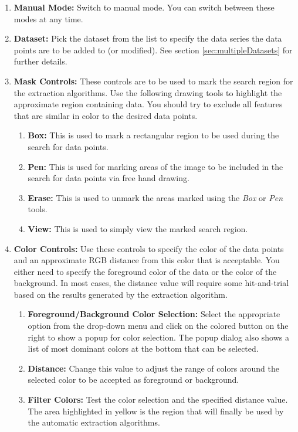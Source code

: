 \documentclass[letterpaper, 11pt]{article}
\begin{document}
\begin{enumerate}
\item{{\bf Manual Mode: }Switch to manual mode. You can switch between these modes at any time.}
\item{{\bf Dataset: }Pick the dataset from the list to specify the data series the data points are to be added to (or modified). See section \ref{sec:multipleDatasets} for further details.}
\item{{\bf Mask Controls:} These controls are to be used to mark the search region for the extraction algorithms. Use the following drawing tools to highlight the approximate region containing data. You should try to exclude all features that are similar in color to the desired data points.}
\begin{enumerate}
    \item{{\bf Box: }This is used to mark a rectangular region to be used during the search for data points.}
    \item{{\bf Pen: }This is used for marking areas of the image to be included in the search for data points via free hand drawing.}
    \item{{\bf Erase: }This is used to unmark the areas marked using the \emph{Box} or \emph{Pen} tools.}
    \item{{\bf View: }This is used to simply view the marked search region.}
\end{enumerate}
\item{{\bf Color Controls: } Use these controls to specify the color of the data points and an approximate RGB distance from this color that is acceptable. You either need to specify the foreground color of the data or the color of the background. In most cases, the distance value will require some hit-and-trial based on the results generated by the extraction algorithm.}
\begin{enumerate}
    \item{{\bf Foreground/Background Color Selection: }Select the appropriate option from the drop-down menu and click on the colored button on the right to show a popup for color selection. The popup dialog also shows a list of most dominant colors at the bottom that can be selected.}
    \item{{\bf Distance: }Change this value to adjust the range of colors around the selected color to be accepted as foreground or background.}
    \item{{\bf Filter Colors: }Test the color selection and the specified distance value. The area highlighted in yellow is the region that will finally be used by the automatic extraction algorithms.}

\end{enumerate}
\end{enumerate}
\end{document}
